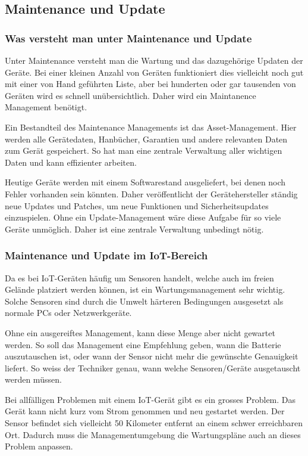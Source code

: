 \subsection{Maintenance und Update}
\subsubsection{Was versteht man unter Maintenance und Update}
Unter Maintenance versteht man die Wartung und das dazugehörige Updaten der Geräte. Bei einer kleinen Anzahl von Geräten funktioniert dies vielleicht noch gut mit einer von Hand geführten Liste, aber bei hunderten oder gar tausenden von Geräten wird es schnell unübersichtlich. Daher wird ein Maintanence Management benötigt.

Ein Bestandteil des Maintenance Managements ist das Asset-Management. Hier werden alle Gerätedaten, Hanbücher, Garantien und andere relevanten Daten zum Gerät gespeichert.\cite{MainAsset} So hat man eine zentrale Verwaltung aller wichtigen Daten und kann effizienter arbeiten.

Heutige Geräte werden mit einem Softwarestand ausgeliefert, bei denen noch Fehler vorhanden sein könnten. Daher veröffentlicht der Gerätehersteller ständig neue Updates und Patches, um neue Funktionen und Sicherheitsupdates einzuspielen. Ohne ein Update-Management wäre diese Aufgabe für so viele Geräte unmöglich. Daher ist eine zentrale Verwaltung unbedingt nötig. 
\subsubsection{Maintenance und Update im IoT-Bereich}
Da es bei IoT-Geräten häufig um Sensoren handelt, welche auch im freien Gelände platziert werden können, ist ein Wartungsmanagement sehr wichtig. Solche Sensoren sind durch die Umwelt härteren Bedingungen ausgesetzt als normale PCs oder Netzwerkgeräte.

Ohne ein ausgereiftes Management, kann diese Menge aber nicht gewartet werden. So soll das Management eine Empfehlung geben, wann die Batterie auszutauschen ist, oder wann der Sensor nicht mehr die gewünschte Genauigkeit liefert. So weiss der Techniker genau, wann welche Sensoren/Geräte ausgetauscht werden müssen.

Bei allfälligen Problemen mit einem IoT-Gerät gibt es ein grosses Problem. Das Gerät kann nicht kurz vom Strom genommen und neu gestartet werden. Der Sensor befindet sich vielleicht 50 Kilometer entfernt an einem schwer erreichbaren Ort. Dadurch muss die Managementumgebung die Wartungspläne auch an dieses Problem anpassen. 

